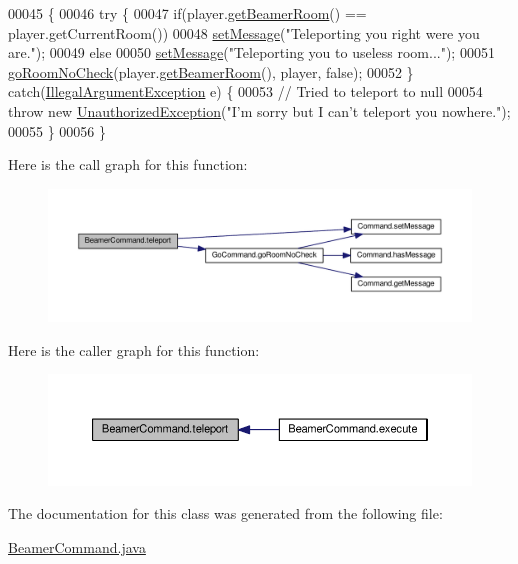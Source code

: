 \begin{DoxyCode}
00045                                                                       \{
00046         \textcolor{keywordflow}{try} \{
00047             \textcolor{keywordflow}{if}(player.\hyperlink{classPlayer_a9114998742351bf793e093cb198993ca}{getBeamerRoom}() == player.getCurrentRoom())
00048                 \hyperlink{classCommand_a715709d8f0ab65879d79ad1725c96f17}{setMessage}(\textcolor{stringliteral}{"Teleporting you right were you are."});
00049             \textcolor{keywordflow}{else}
00050                 \hyperlink{classCommand_a715709d8f0ab65879d79ad1725c96f17}{setMessage}(\textcolor{stringliteral}{"Teleporting you to useless room..."});
00051             \hyperlink{classGoCommand_a3149bf695c19b78c39cfc4dadece7846}{goRoomNoCheck}(player.\hyperlink{classPlayer_a9114998742351bf793e093cb198993ca}{getBeamerRoom}(), player, \textcolor{keyword}{false});
00052         \} \textcolor{keywordflow}{catch}(\hyperlink{classIllegalArgumentException}{IllegalArgumentException} e) \{
00053             \textcolor{comment}{// Tried to teleport to null}
00054             \textcolor{keywordflow}{throw} \textcolor{keyword}{new} \hyperlink{classUnauthorizedException}{UnauthorizedException}(\textcolor{stringliteral}{"I'm sorry but I can't teleport you
       nowhere."});
00055         \}
00056     \}
\end{DoxyCode}


Here is the call graph for this function\-:
\nopagebreak
\begin{figure}[H]
\begin{center}
\leavevmode
\includegraphics[width=350pt]{classBeamerCommand_a1f19366fb8b873959f72f38d49d5b178_cgraph}
\end{center}
\end{figure}




Here is the caller graph for this function\-:
\nopagebreak
\begin{figure}[H]
\begin{center}
\leavevmode
\includegraphics[width=350pt]{classBeamerCommand_a1f19366fb8b873959f72f38d49d5b178_icgraph}
\end{center}
\end{figure}




The documentation for this class was generated from the following file\-:\begin{DoxyCompactItemize}
\item 
\hyperlink{BeamerCommand_8java}{Beamer\-Command.\-java}\end{DoxyCompactItemize}
